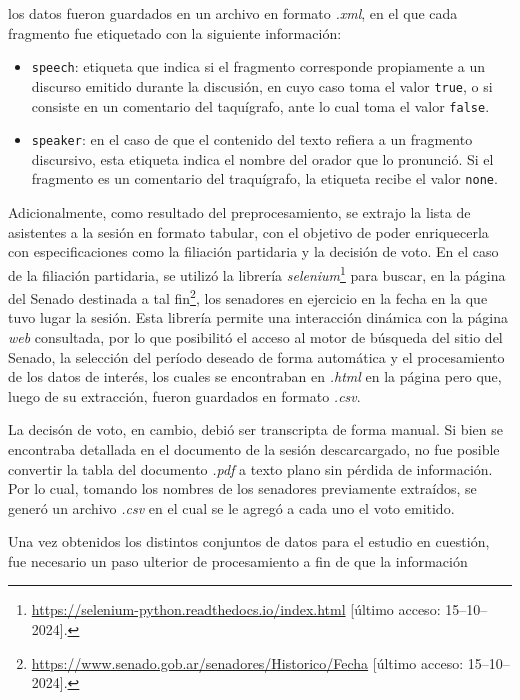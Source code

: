 los datos fueron guardados en un archivo en formato \textit{.xml}, en el que
cada fragmento fue etiquetado con la siguiente informaci\'on:
\begin{itemize}
    \item \texttt{speech}: etiqueta que indica si el fragmento corresponde
    propiamente a un discurso emitido durante la discusi\'on, en cuyo caso toma el
    valor \texttt{true}, o si consiste en un comentario del taqu\'igrafo, ante lo cual
    toma el valor \texttt{false}.
    \item \texttt{speaker}: en el caso de que el contenido del texto refiera a
    un fragmento discursivo, esta etiqueta indica el nombre del orador que lo
    pronunci\'o. Si el fragmento es un comentario del traqu\'igrafo, la etiqueta
    recibe el valor \texttt{none}.
\end{itemize}
\par
Adicionalmente, como resultado del preprocesamiento, se extrajo la lista de
asistentes a la sesi\'on en formato tabular, con el objetivo de poder
enriquecerla con especificaciones como la filiaci\'on partidaria y la
decisi\'on de voto. En el caso de la filiaci\'on partidaria, se utiliz\'o la
librer\'ia \textit{selenium}\footnote{\url{https://selenium-python.readthedocs.io/index.html}
[\'ultimo acceso: 15--10--2024].}
para buscar, en la {p\'agina} del Senado destinada a tal
fin\footnote{\url{https://www.senado.gob.ar/senadores/Historico/Fecha}
[\'ultimo acceso: 15--10--2024].},
los senadores en ejercicio en la fecha en la que tuvo lugar la sesi\'on.
Esta librer\'ia permite una interacci\'on din\'amica con la p\'agina \textit{web} consultada,
por lo que posibilit\'o el acceso al motor de b\'usqueda del sitio del Senado, la selecci\'on
del per\'iodo deseado de forma autom\'atica y el procesamiento de los datos de inter\'es,
los cuales se encontraban en \textit{.html} en la p\'agina pero que, luego de su
extracci\'on, fueron guardados en formato \textit{.csv}.
\par
La decis\'on de voto, en cambio, debi\'o ser transcripta de forma manual. Si bien
se encontraba detallada en el documento de la sesi\'on descarcargado, no fue posible
convertir la tabla del documento \textit{.pdf} a texto plano sin p\'erdida de informaci\'on.
Por lo cual, tomando los nombres de los senadores previamente extra\'idos, se gener\'o
un archivo \textit{.csv} en el cual se le agreg\'o a cada uno el voto emitido.
\par
Una vez obtenidos los distintos conjuntos de datos para el estudio en cuesti\'on,
fue necesario un paso ulterior de procesamiento a fin de que la informaci\'on
